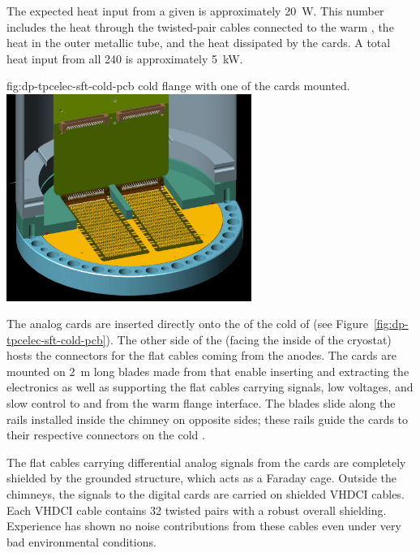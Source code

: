 The expected heat input from a given  is approximately \SI{20}{\watt}. This number includes the heat through the twisted-pair cables connected to the warm \fdth, the heat in the   outer metallic tube, and the heat dissipated by the  cards. A total heat input from all \num{240}  is approximately \SI{5}{\kilo\watt}. 

\begin{dunefigure}{fig:dp-tpcelec-sft-cold-pcb}
{ cold \fdth flange with one of the  cards mounted.}
\includegraphics[width=0.6\textwidth]{graphics/dp-tpcelec-sft-cold-pcb}
\end{dunefigure}

The analog  cards are inserted directly onto the  of the cold \fdth of  (see Figure~\ref{fig:dp-tpcelec-sft-cold-pcb}). The other side of the  (facing the inside of the cryostat) hosts the connectors for the flat cables coming from the  anodes.  The  cards are mounted on \SI{2}{\m} long blades made from \frfour that enable inserting and extracting the electronics as well as supporting the flat cables carrying signals, low voltages, and slow control to and from the warm flange interface.  The blades slide along the rails installed inside the chimney on opposite sides; these rails guide the  cards to their respective connectors on the cold \fdth. 

The flat cables carrying differential analog signals from the  cards are completely shielded by the grounded  structure, which acts as a Faraday cage. Outside the chimneys, the signals to the digital cards are carried on shielded VHDCI cables. Each VHDCI cable contains \num{32} twisted pairs with a robust overall shielding. Experience has shown no noise contributions from these cables even under very bad environmental conditions.


